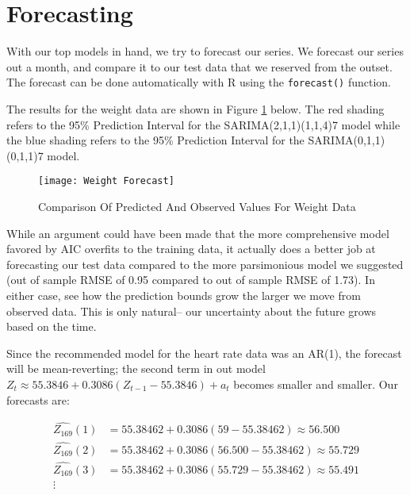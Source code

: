 \documentclass[12pt, letterpaper]{article}
\theoremstyle{definition}
\numberwithin{equation}{section}
\newcommand{\+}[1]{+_{\scalebox{.375}{#1}}}
\newcommand{\1}{\mathbbm{1}}
\begin{document}
\newpage
\section{Forecasting}
\label{section.forecasting}

With our top models in hand, we try to forecast our series. We forecast our series out a month, and compare it to our test data that we reserved from the outset.  The forecast can be done automatically with R using the \texttt{forecast()} function. 
\vspace{\baselineskip}

The results for the weight data are shown in Figure \ref{Weight Forecast} below. The red shading refers to the 95\% Prediction Interval for the SARIMA(2,1,1)(1,1,4)7 model while the blue shading refers to the 95\% Prediction Interval for the SARIMA(0,1,1)(0,1,1)7 model.

\begin{figure}[H]
	\centering
	\texttt{[image: Weight Forecast]}
	\caption{Comparison Of Predicted And Observed Values For Weight Data}
	\label{Weight Forecast}
\end{figure}

While an argument could have been made that the more comprehensive model favored by AIC overfits to the training data, it actually does a better job at forecasting our test data compared to the more parsimonious model we suggested (out of sample RMSE of 0.95 compared to out of sample RMSE of 1.73). In either case, see how the prediction bounds grow the larger we move from observed data. This is only natural-- our uncertainty about the future grows based on the time.
\vspace{\baselineskip}

Since the recommended model for the heart rate data was an AR(1), the forecast will be mean-reverting; the second term in out model $Z_t \approx 55.3846+0.3086(Z_{t-1}-55.3846)+a_t$ becomes smaller   and smaller. Our forecasts are:

\vspace{-0.5cm}
\begin{align*}
	\widehat{Z_{169}}(1) &=55.38462+0.3086(59-55.38462)\approx56.500\\
	\widehat{Z_{169}}(2) &=55.38462+0.3086(56.500-55.38462)\approx 55.729\\
	\widehat{Z_{169}}(3) &=55.38462+0.3086(55.729-55.38462)\approx 55.491\\
	\vdots
\end{align*}
\end{document}

